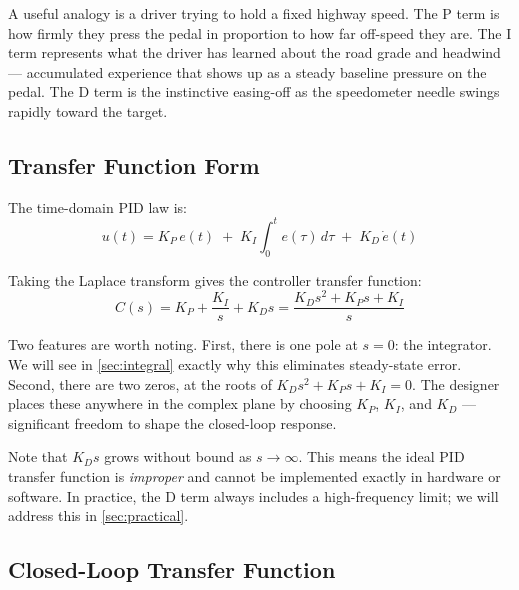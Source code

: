 \documentclass[12pt]{article}
\begin{document}
A useful analogy is a driver trying to hold a fixed highway speed.  The P term
is how firmly they press the pedal in proportion to how far off-speed they are.
The I term represents what the driver has learned about the road grade and
headwind --- accumulated experience that shows up as a steady baseline pressure
on the pedal.  The D term is the instinctive easing-off as the speedometer
needle swings rapidly toward the target.

\subsection{Transfer Function Form}

The time-domain PID law is:
\begin{equation}
  u(t) = K_P\, e(t) \;+\; K_I \int_0^t e(\tau)\,d\tau \;+\; K_D\, \dot{e}(t)
  \label{eq:pid_time}
\end{equation}

Taking the Laplace transform gives the controller transfer function:
\begin{equation}
  C(s) = K_P + \frac{K_I}{s} + K_D s = \frac{K_D s^2 + K_P s + K_I}{s}
  \label{eq:pid_tf}
\end{equation}

Two features are worth noting.  First, there is one pole at $s = 0$: the
integrator.  We will see in \cref{sec:integral} exactly why this eliminates
steady-state error.  Second, there are two zeros, at the roots of
$K_D s^2 + K_P s + K_I = 0$.  The designer places these anywhere in the
complex plane by choosing $K_P$, $K_I$, and $K_D$ --- significant freedom to
shape the closed-loop response.

Note that $K_D s$ grows without bound as $s \to \infty$.  This means the ideal
PID transfer function is \emph{improper} and cannot be implemented exactly in
hardware or software.  In practice, the D term always includes a high-frequency
limit; we will address this in \cref{sec:practical}.

\subsection{Closed-Loop Transfer Function}
\end{document}

